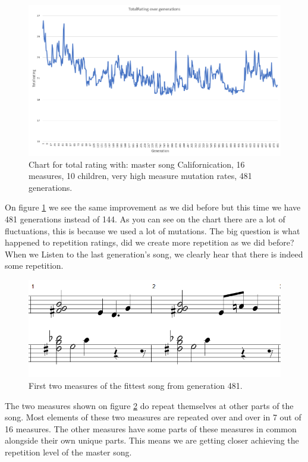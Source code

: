 \documentclass[a4paper]{article}
\begin{document}
\begin{figure}[H]
	\advance\leftskip-1.5cm
	\includegraphics[width=1.2\textwidth]{Fotos/results/rhcp/total_rating_2_graph.png}
	\caption{Chart for total rating with: master song Californication, 16 measures, 10 children, very high measure mutation rates, 481 generations.}
	\label{fig:rhcp_2}
\end{figure}

On figure \ref{fig:rhcp_2} we see the same improvement as we did before but this time we have 481 generations instead of 144. As you can see on the chart there are a lot of fluctuations, this is because we used a lot of mutations. The big question is what happened to repetition ratings, did we create more repetition as we did before? When we Listen to the last generation's song, we clearly hear that there is indeed some repetition.

\begin{figure}[H]
	\includegraphics[width=\textwidth]{Fotos/results/rhcp/song2.png}
	\caption{First two measures of the fittest song from generation 481.}
	\label{fig:rhcp_2_song}
\end{figure}

The two measures shown on figure \ref{fig:rhcp_2_song} do repeat themselves at other parts of the song. Most elements of these two measures are repeated over and over in 7 out of 16 measures. The other measures have some parts of these measures in common alongside their own unique parts. This means we are getting closer achieving the repetition level of the master song.
\end{document}
